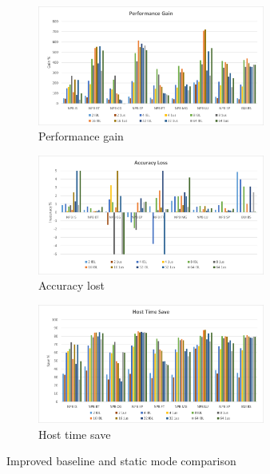 \begin{figure}[H]
    \centering
    \begin{subfigure}{\textwidth}
        \centering
        \includegraphics[width=0.82\textwidth]{Images/Performance_FINAL.png}
        \caption{ Performance gain}
        \label{fig:Performance_FINAL}
    \end{subfigure}
    \begin{subfigure}{\textwidth}
        \centering
        \includegraphics[width=0.82\textwidth]{Images/Accuracy_FINAL.png}
        \caption{ Accuracy lost}
        \label{fig:Accuracy_FINAL}
    \end{subfigure}
    \begin{subfigure}{\textwidth}
        \centering
        \includegraphics[width=0.82\textwidth]{Images/Host_FINAL.png}
        \caption{ Host time save}
        \label{fig:Host_FINAL}
    \end{subfigure}

\caption{Improved baseline and static mode comparison}
\label{fig:results_FINAL}
\end{figure}

